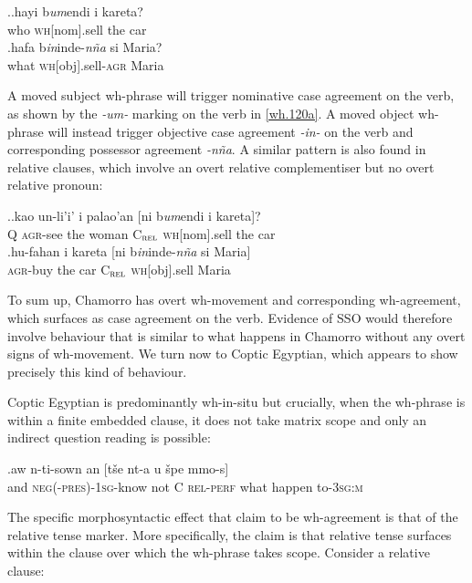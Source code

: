 \documentclass[11pt]{article}
\begin{document}
\ex.\ag.\label{wh.120a}hayi b\textit{um}endi i kareta?\\
   who \textsc{wh}[nom].sell the car\\
   \bg.\label{wh.120b}hafa b\textit{in}inde-\textit{n\~na} si Maria?\\
   what \textsc{wh}[obj].sell-\textsc{agr} {} Maria\\

A moved subject wh-phrase will trigger nominative case agreement on the verb, as shown by the \textit{-um-} marking on the verb in \ref{wh.120a}. A moved object wh-phrase will instead trigger objective case agreement \textit{-in-} on the verb and corresponding possessor agreement \textit{-n\~na}. A similar pattern is also found in relative clauses, which involve an overt relative complementiser but no overt relative pronoun:

\ex.\ag.\label{wh.130a}kao un-li'i' i palao'an [ni b\textit{um}endi i kareta]?\\
   Q \textsc{agr}-see the woman C$_{\textsc{rel}}$ \textsc{wh}[nom].sell the car\\
   \bg.\label{wh.130b}hu-fahan i kareta [ni b\textit{in}inde-\textit{n\~na} si Maria]\\
   \textsc{agr}-buy the car C$_{\textsc{rel}}$ \textsc{wh}[obj].sell {} Maria\\

To sum up, Chamorro has overt wh-movement and corresponding wh-agreement, which surfaces as case agreement on the verb. Evidence of SSO would therefore involve behaviour that is similar to what happens in Chamorro without any overt signs of wh-movement. We turn now to Coptic Egyptian, which appears to show precisely this kind of behaviour.

Coptic Egyptian is predominantly wh-in-situ but crucially, when the wh-phrase is within a finite embedded clause, it does not take matrix scope and only an indirect question reading is possible:

\exg.\label{wh.140}aw{\textopeno} n-ti-sown an [t\v{s}e nt-a u \v{s}{\textopeno}pe mmo-s]\\
   and \textsc{neg(-pres)-1sg}-know not C \textsc{rel-perf} what happen to-\textsc{3sg:m}\\

The specific morphosyntactic effect that \cite{rlc:2006} claim to be wh-agreement is that of the relative tense marker. More specifically, the claim is that relative tense surfaces within the clause over which the wh-phrase takes scope. Consider a relative clause:
\end{document}
